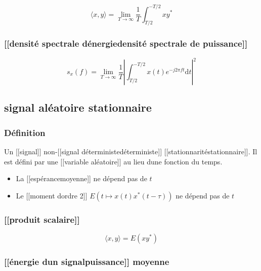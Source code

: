 \documentclass[
]{article}
\providecommand{\tightlist}{%
  \setlength{\itemsep}{0pt}\setlength{\parskip}{0pt}}
\begin{document}
\[
\langle x, y\rangle = \lim_{T\to \infty} \frac{1}{T} \int^{-T/2}_{T/2} xy^\ast
\]

\hypertarget{densituxe9-spectrale-duxe9nergiedensituxe9-spectrale-de-puissance-1}{%
\subsubsection{{[}{[}densité spectrale
d\textquotesingle énergie\textbar densité spectrale de
puissance{]}{]}}\label{densituxe9-spectrale-duxe9nergiedensituxe9-spectrale-de-puissance-1}}

\[
s_x(f) = \lim_{T\to \infty} \frac{1}{T} \left| \int^{-T/2}_{T/2} x(t) e^{-j2\pi ft} \mathrm{d}t \right|^2
\]

\hypertarget{signal-aluxe9atoire-stationnaire}{%
\subsection{signal aléatoire
stationnaire}\label{signal-aluxe9atoire-stationnaire}}

\hypertarget{duxe9finition-3}{%
\subsubsection{Définition}\label{duxe9finition-3}}

Un {[}{[}signal{]}{]} non-{[}{[}signal
déterministe\textbar déterministe{]}{]}
{[}{[}stationnarité\textbar stationnaire{]}{]}. Il est défini par une
{[}{[}variable aléatoire{]}{]} au lieu d\textquotesingle une fonction du
temps.

\begin{itemize}
\tightlist
\item
  La {[}{[}espérance\textbar moyenne{]}{]} ne dépend pas de \(t\)
\item
  Le {[}{[}moment d\textquotesingle ordre 2{]}{]}
  \(E(t\mapsto x(t) x^\ast(t-\tau))\) ne dépend pas de \(t\)
\end{itemize}

\hypertarget{produit-scalaire-1}{%
\subsubsection{{[}{[}produit scalaire{]}{]}}\label{produit-scalaire-1}}

\[
\langle x, y \rangle = E(xy^\ast)
\]

\hypertarget{uxe9nergie-dun-signalpuissance-moyenne}{%
\subsubsection{{[}{[}énergie d\textquotesingle un
signal\textbar puissance{]}{]}
moyenne}\label{uxe9nergie-dun-signalpuissance-moyenne}}
\end{document}
